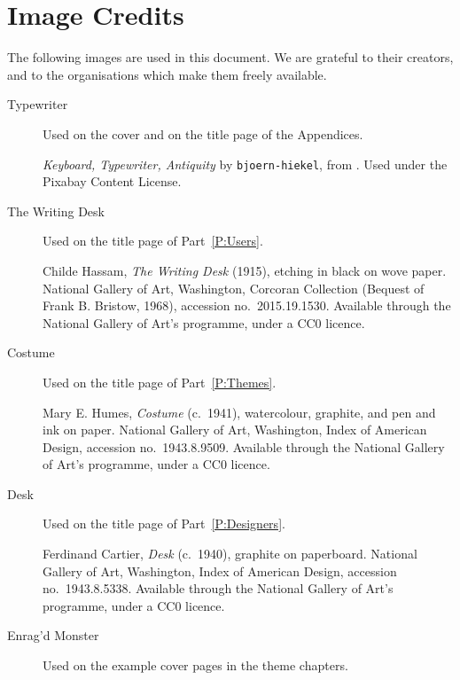 \chapter{Image Credits}\label{C:Attribution}

	The following images are used in this document. We are grateful to their creators, and to the organisations which make them freely available.

	\begin{description}
		\item[Typewriter] Used on the cover and on the title page of the Appendices.

		      \textit{Keyboard, Typewriter, Antiquity} by \texttt{bjoern-hiekel}, from . Used under the Pixabay Content License.

		\item[The Writing Desk] Used on the title page of Part~\ref{P:Users}.

		      Childe Hassam, \textit{The Writing Desk} (1915), etching in black on wove paper. National Gallery of Art, Washington, Corcoran Collection (Bequest of Frank B. Bristow, 1968), accession no.~2015.19.1530. Available through the National Gallery of Art's  programme, under a CC0 licence.

		\item[Costume] Used on the title page of Part~\ref{P:Themes}.

		      Mary E. Humes, \textit{Costume} (c.~1941), watercolour, graphite, and pen and ink on paper. National Gallery of Art, Washington, Index of American Design, accession no.~1943.8.9509. Available through the National Gallery of Art's  programme, under a CC0 licence.

		\item[Desk] Used on the title page of Part~\ref{P:Designers}.

		      Ferdinand Cartier, \textit{Desk} (c.~1940), graphite on paperboard. National Gallery of Art, Washington, Index of American Design, accession no.~1943.8.5338. Available through the National Gallery of Art's  programme, under a CC0 licence.
		\item[Enrag'd Monster] Used on the example cover pages in the theme chapters.


\end{description}
